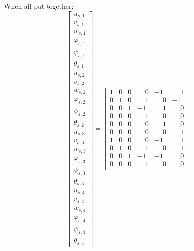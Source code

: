 \documentclass[10pt,b5paper,titlepage]{book}
\begin{document}
When all put together:
\begin{equation}
    \begin{bmatrix}
        u_{s,1} \\
        v_{s,1} \\
        w_{s,1} \\
        \varphi_{s,1} \\
        \psi_{s,1} \\
        \theta_{s,1} \\
        u_{s,2} \\
        v_{s,2} \\
        w_{s,2} \\
        \varphi_{s,2} \\
        \psi_{s,2} \\
        \theta_{s,2} \\
        u_{s,3} \\
        v_{s,3} \\
        w_{s,3} \\
        \varphi_{s,3} \\
        \psi_{s,3} \\
        \theta_{s,3} \\
        u_{s,4} \\
        v_{s,4} \\
        w_{s,4} \\
        \varphi_{s,4} \\
        \psi_{s,4} \\
        \theta_{s,4}
    \end{bmatrix}
    = \begin{bmatrix}
        1 & 0 & 0 & \phantom{-}0 & -1 & \phantom{-}1 \\
        0 & 1 & 0 & \phantom{-}1 & \phantom{-}0 & -1 \\
        0 & 0 & 1 & -1 & \phantom{-}1 & \phantom{-}0 \\
        0 & 0 & 0 & \phantom{-}1 & \phantom{-}0 & \phantom{-}0 \\
        0 & 0 & 0 & \phantom{-}0 & \phantom{-}1 & \phantom{-}0 \\
        0 & 0 & 0 & \phantom{-}0 & \phantom{-}0 & \phantom{-}1 \\
        1 & 0 & 0 & \phantom{-}0 & -1 & \phantom{-}1 \\
        0 & 1 & 0 & \phantom{-}1 & \phantom{-}0 & \phantom{-}1 \\
        0 & 0 & 1 & -1 & -1 & \phantom{-}0 \\
        0 & 0 & 0 & \phantom{-}1 & \phantom{-}0 & \phantom{-}0 \\

\end{bmatrix}
\end{equation}
\end{document}

